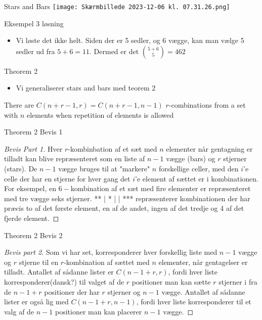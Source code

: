 \documentclass{beamer}
\begin{document}
\begin{frame}{Stars and Bars}
    \texttt{[image: Skærmbillede 2023-12-06 kl. 07.31.26.png]}
\end{frame}

\begin{frame}{Eksempel 3 løsning}
   \begin{itemize}
       \item Vi løste det ikke helt. Siden der er 5 sedler, og 6 vægge, kan man vælge 5 sedler ud fra $5+6 = 11$. Dermed er det $\binom{5+6}{5} = 462$
   \end{itemize} 
\end{frame}

\begin{frame}{Theorem 2}
   \begin{itemize}
       \item Vi generaliserer stars and bars med teorem 2
   \end{itemize} 
   \begin{theorem}
       There are $C(n+r-1,r) = C(n+r-1,n-1)$ $r$-combinations from a set with $n$ elements when repetition of elements is allowed
   \end{theorem}
\end{frame}
\begin{frame}[allowframebreaks]{Theorem 2 Bevis 1}
   \begin{proof}[Bevis Part 1]
       Hver $r$-kombinbation af et sæt med $n$ elementer når gentagning er tilladt kan blive repræsenteret som en liste af $n-1$ vægge (bars) og $r$ stjerner (stars).
       De $n-1$ vægge bruges til at "markere" $n$ forskellige celler, med den $i$'e celle der har en stjerne for hver gang det $i$'e element af sættet er i kombinationen. For eksempel, en $6-$kombination af et sæt med fire elementer er repræsenteret med tre vægge seks stjerner. ** | * | | *** repræsenterer kombinationen der har præcis to af det første element, en af de andet, ingen af det tredje og 4 af det fjerde element. 

   \end{proof} 
\end{frame}
\begin{frame}{Theorem 2 Bevis 2}
    \begin{proof}[Bevis part 2]
       Som vi har set, korresponderer hver forskellig liste med $n-1$ vægge og $r$ stjerne til en $r$-kombination af sættet med $n$ elementer, når gentagelser er tilladt. Antallet af sådanne lister er $C(n-1+r,r)$, fordi hver liste korresponderer(dansk?) til valget af de $r$ positioner man kan sætte $r$ stjerner i fra de $n-1+r$ positioner der har $r$ stjerner og $n-1$ vægge. Antallet af sådanne lister er også lig med $C(n-1+r,n-1)$, fordi hver liste korresponderer til et valg af de $n-1$ positioner man kan placerer $n-1$ vægge.
    \end{proof}
\end{frame}
\end{document}
